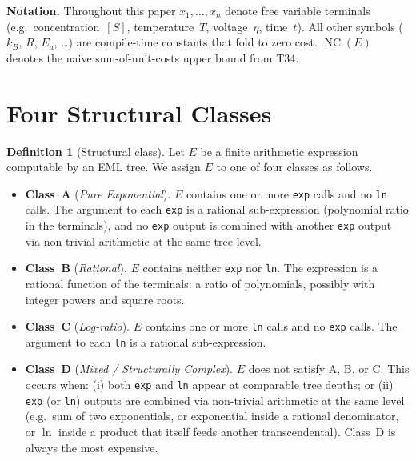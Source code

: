 \documentclass[12pt,a4paper]{article}
\theoremstyle{definition}
\newtheorem{definition}[theorem]{Definition}
\newcommand{\NC}{\operatorname{NC}}
\newcommand{\cls}[1]{\textbf{Class~#1}}
\begin{document}
\medskip
\noindent\textbf{Notation.}
Throughout this paper $x_1, \ldots, x_n$ denote free variable terminals
(e.g.\ concentration~$[S]$, temperature~$T$, voltage~$\eta$, time~$t$).
All other symbols ($k_B$, $R$, $E_a$, \ldots) are compile-time constants
that fold to zero cost.
$\NC(E)$ denotes the naive sum-of-unit-costs upper bound from T34.

\section{Four Structural Classes}
\label{sec:classes}

\begin{definition}[Structural class]
\label{def:classes}
Let $E$ be a finite arithmetic expression computable by an EML tree.
We assign $E$ to one of four classes as follows.

\medskip
\begin{itemize}
  \item \cls{A} (\emph{Pure Exponential}).
        $E$ contains one or more \texttt{exp} calls and no \texttt{ln} calls.
        The argument to each \texttt{exp} is a rational sub-expression
        (polynomial ratio in the terminals), and no \texttt{exp} output is
        combined with another \texttt{exp} output via non-trivial arithmetic
        at the same tree level.

  \item \cls{B} (\emph{Rational}).
        $E$ contains neither \texttt{exp} nor \texttt{ln}.
        The expression is a rational function of the terminals: a ratio of
        polynomials, possibly with integer powers and square roots.

  \item \cls{C} (\emph{Log-ratio}).
        $E$ contains one or more \texttt{ln} calls and no \texttt{exp} calls.
        The argument to each \texttt{ln} is a rational sub-expression.

  \item \cls{D} (\emph{Mixed / Structurally Complex}).
        $E$ does not satisfy A, B, or C.
        This occurs when:
        (i) both \texttt{exp} and \texttt{ln} appear at comparable tree depths;
        or (ii) \texttt{exp} (or \texttt{ln}) outputs are combined via
        non-trivial arithmetic at the same level (e.g.\ sum of two
        exponentials, or exponential inside a rational denominator, or
        $\ln$ inside a product that itself feeds another transcendental).
        Class~D is always the most expensive.
\end{itemize}
\end{definition}
\end{document}
